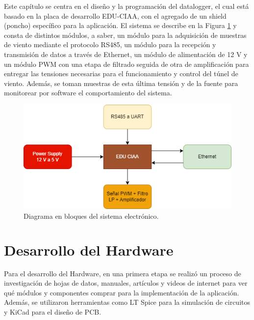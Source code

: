 Este capítulo se centra en el diseño y la programación del datalogger, el cual está basado en la placa de desarrollo EDU-CIAA, con el agregado de un shield (poncho) específico para la aplicación. El sistema se describe en la Figura \ref{fig:esquemaHardarware} y consta de distintos módulos, a saber, un módulo para la adquisición de muestras de viento mediante el protocolo RS485, un módulo para la recepción y transmisión de datos a través de Ethernet, un módulo de alimentación de 12 \unit{\volt} y un módulo PWM con una etapa de filtrado seguida de otra de amplificación para entregar las tensiones necesarias para el funcionamiento y control del túnel de viento. Además, se toman muestras de esta última tensión y de la fuente para monitorear por software el comportamiento del sistema.

\begin{figure}[H]
    \centering
    \includegraphics[width=0.85\linewidth]{Figuras/datalogger/esquemaHardarware.png}
    \caption{Diagrama en bloques del sistema electrónico.}
    \label{fig:esquemaHardarware}
\end{figure}




\section{Desarrollo del Hardware}\label{sec:desarrolloHardware}


Para el desarrollo del Hardware, en una primera etapa se realizó un proceso de investigación de hojas de datos, manuales, artículos y videos de internet para ver qué módulos y componentes comprar para la implementación de la aplicación. Además, se utilizaron herramientas como LT Spice para la simulación de circuitos y KiCad para el diseño de PCB. 

